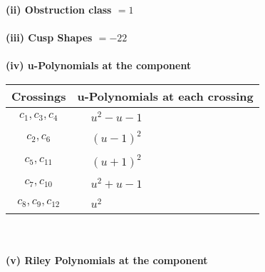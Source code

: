 \documentclass[1p]{elsarticle_modified}
\theoremstyle{definition}
\begin{document}
\flushleft \textbf{(ii) Obstruction class $= 1$}\\~\\
\flushleft \textbf{(iii) Cusp Shapes $= -22$}\\~\\
\newpage\renewcommand{\arraystretch}{1}
\flushleft \textbf{(iv) u-Polynomials at the component}\newline \\
\begin{tabular}{m{50pt}|m{274pt}}
Crossings & \hspace{64pt}u-Polynomials at each crossing \\
\hline $$\begin{aligned}c_{1},c_{3},c_{4}\end{aligned}$$&$\begin{aligned}
&u^2- u-1
\end{aligned}$\\
\hline $$\begin{aligned}c_{2},c_{6}\end{aligned}$$&$\begin{aligned}
&(u-1)^2
\end{aligned}$\\
\hline $$\begin{aligned}c_{5},c_{11}\end{aligned}$$&$\begin{aligned}
&(u+1)^2
\end{aligned}$\\
\hline $$\begin{aligned}c_{7},c_{10}\end{aligned}$$&$\begin{aligned}
&u^2+u-1
\end{aligned}$\\
\hline $$\begin{aligned}c_{8},c_{9},c_{12}\end{aligned}$$&$\begin{aligned}
&u^2
\end{aligned}$\\
\hline
\end{tabular}\\~\\
\newpage\renewcommand{\arraystretch}{1}
\flushleft \textbf{(v) Riley Polynomials at the component}\newline \\
\end{document}
